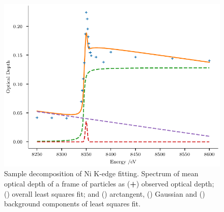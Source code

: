 \documentclass{article}
\begin{document}
\begin{figure}
  \begin{center}
    \includegraphics{figures/kedge-decomposition.pdf}
  \end{center}
  \caption{Sample decomposition of Ni K-edge fitting. Spectrum of mean
    optical depth of a frame of \nca{} particles as
    (\textcolor{C0}{\textbf{+}}) observed optical depth;
    (\textcolor{C1}{\mplline{}}) overall least squares fit; and
    (\textcolor{C2}{\mpldashes{}}) arctangent,
    (\textcolor{C3}{\mpldashes{}}) Gaussian and
    (\textcolor{C4}{\mpldashes{}}) background components of least
    squares fit.}
  \label{fig:kedge-decomposition}
\end{figure}
\end{document}
